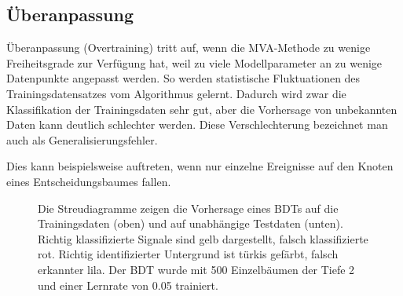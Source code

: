 
\subsection{\"Uberanpassung}
\label{ch:Algorithmen:subsec:overtraining}

\"Uberanpassung (Overtraining) tritt auf, wenn die MVA-Methode zu wenige Freiheitsgrade zur Verf\"ugung hat, weil zu viele Modellparameter an zu wenige Datenpunkte angepasst werden. So werden statistische Fluktuationen des Trainingsdatensatzes vom Algorithmus gelernt. Dadurch wird zwar die Klassifikation der Trainingsdaten sehr gut, aber die Vorhersage von unbekannten Daten kann deutlich schlechter werden. Diese Verschlechterung bezeichnet man auch als Generalisierungsfehler.

Dies kann beispielsweise auftreten, wenn nur einzelne Ereignisse auf den Knoten eines Entscheidungsbaumes fallen.\\

\begin{figure}[tbp]
\centering     %
{}
\parbox[b]{12cm}{
\caption{Die Streudiagramme zeigen die Vorhersage eines BDTs auf die Trainingsdaten (oben) und auf unabh\"angige Testdaten (unten). Richtig klassifizierte Signale sind gelb dargestellt, falsch klassifizierte rot. Richtig identifizierter Untergrund ist t\"urkis gef\"arbt, falsch erkannter lila. Der BDT wurde mit \num{500} Einzelb\"aumen der Tiefe \num{2} und einer Lernrate von \num{0,05} trainiert.}
}
\label{fig:boosting}
\end{figure}

